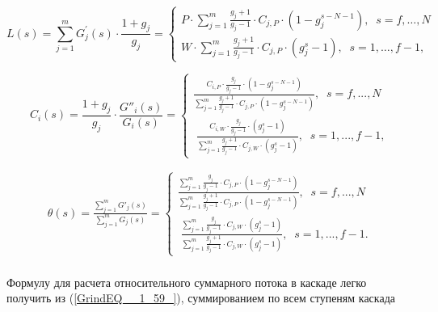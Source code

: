 \begin{equation} \label{GrindEQ__1_59_} 
  L(s)=\sum_{j=1}^{m} G_{j}^{\prime}(s) \cdot \frac{1+g_{j}}{g_{j}}=\left\{\begin{array}{c}
  P \cdot \sum_{j=1}^{m} \frac{g_{j}+1}{g_{j}-1} \cdot C_{j,P} \cdot \left(1-g_{j}^{s-N-1}\right),\; \;  s=f, \ldots, N \\
  W \cdot \sum_{j=1}^{m} \frac{g_{j}+1}{g_{j}-1} \cdot C_{j,P} \cdot \left(g_{j}^{s}-1\right),\; \;  s=1, \ldots, f-1,
  \end{array}\right.
\end{equation} 

\begin{equation} \label{GrindEQ__1_60_} 
  C_{i} (s)=\frac{1+g_{j} }{g_{j} } \cdot \frac{G''_{i} (s)}{G_{i} (s)} =\left\{\begin{array}{l} {\frac{C_{i,P}\cdot \frac{g_{j} }{g_{j} -1}\cdot \left(1-g_{j}^{s-N-1} \right)}{\sum _{j=1}^{m}\frac{g_{j} +1}{g_{j} -1} \cdot C_{j,P} \cdot \left(1-g_{j}^{s-N-1} \right)} ,\; \; s=f,...,N} \\ {\; \frac{C_{i,W} \cdot \frac{g_{j} }{g_{j} -1} \cdot \left(g_{j}^{s} -1\right)}{\sum _{j=1}^{m}\frac{g_{j} +1}{g_{j} -1} \cdot C_{j,W} \cdot \left(g_{j}^{s} -1\right)} ,\; \; s=1,...,f-1,} \end{array}\right.  
\end{equation} 

\begin{equation} \label{GrindEQ__1_61_} 
  \begin{array}{l} {\theta (s)=\frac{\sum _{j=1}^{m}G'_{j} (s) }{\sum _{j=1}^{m}G_{j} (s) } =\left\{\begin{array}{l} {\frac{\sum _{j=1}^{m}\frac{g_{j} }{g_{j} -1} \cdot C_{j,P} \cdot \left(1-g_{j}^{s-N-1} \right) }{\sum _{j=1}^{m}\frac{g_{j} +1}{g_{j} -1} \cdot C_{j,P} \cdot \left(1-g_{j}^{s-N-1} \right)} ,\; \; s=f,...,N} \\ {\; \frac{\sum _{j=1}^{m}\frac{g_{j} }{g_{j} -1} \cdot C_{j,W} \cdot \left(g_{j}^{s} -1\right) }{\sum _{j=1}^{m}\frac{g_{j} +1}{g_{j} -1} \cdot C_{j,W} \cdot \left(g_{j}^{s} -1\right)} ,\; \; s=1,...,f-1.} \end{array}\right. } \\ {\; } \end{array} 
\end{equation}

Формулу для расчета относительного суммарного потока в каскаде легко получить из (\ref{GrindEQ__1_59_}), суммированием по всем ступеням каскада

